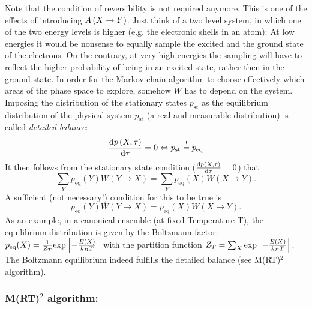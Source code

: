 Note that the condition of reversibility is not required anymore. This is one of the effects of introducing $A\left(X\rightarrow Y\right)$. Just think of a two level system, in which one of the two energy levels is higher (e.g. the electronic shells in an atom): At low energies it would be nonsense to equally sample the excited and the ground state of the electrons. On the contrary, at very high energies the sampling will have to reflect the higher probability of being in an excited state, rather then in the ground state. In order for the Markov chain algorithm to choose effectively which areas of the phase space to explore, somehow $W$ has to depend on the system. Imposing the distribution of the stationary states $p_\text{st}$ as the equilibrium distribution of the physical system $p_\text{st}$ (a real and measurable distribution) is called \emph{detailed balance}:
\begin{equation}
\frac{\text{d} p\left(X,\tau\right)}{\text{d} \tau}=0 \Leftrightarrow p_{\text{st}} \overset{!}{=}  p_{\text{eq}}
\label{eq:detailed_balance}
\end{equation}
It then follows from the stationary state condition ($\frac{\text{d} p\left(X,\tau\right)}{\text{d} \tau}=0$) that
$$\sum_Y{p_{\text{eq}}(Y)W(Y\rightarrow X)}  = \sum_Y{p_{\text{eq}}(X)W(X\rightarrow Y)}.$$ 
A sufficient (not necessary!) condition for this to be true is
 \begin{equation}
 {p_{\text{eq}}(Y)W(Y\rightarrow X)}  = {p_{\text{eq}}(X)W(X\rightarrow Y)}.
 \label{eq:detailed_balance2}
 \end{equation}
As an example, in a canonical ensemble (at fixed Temperature T), the equilibrium distribution is given by the Boltzmann factor: $p_{	\text{eq}}(X)= \frac{1}{Z_T}\text{exp}\left[-\frac{E(X)}{k_BT}\right]$ with the partition function $Z_T=\sum_X{ \text{exp}\left[-\frac{E(X)}{k_BT}\right] }$. The Boltzmann equilibrium indeed fulfills the detailed balance (see M(RT)$^2$ algorithm).




\subsubsection*{M(RT)$^2$ algorithm:}

